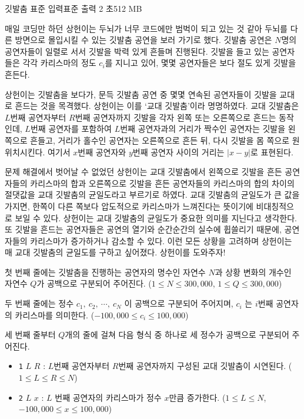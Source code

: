 \begin{problem}{깃발춤}
    {표준 입력}{표준 출력}
    {2 초}{512 MB}{}
    
    매일 코딩만 하던 상헌이는 두뇌가 너무 코드에만 범벅이 되고 있는 것 같아 두뇌를 다른 방면으로 몰입시킬 수 있는 깃발춤 공연을 보러 가기로 했다. 깃발춤 공연은 $ N $명의 공연자들이 일렬로 서서 깃발을 박력 있게 흔들며 진행된다. 깃발을 들고 있는 공연자들은 각각 카리스마의 정도 $ c_i $를 지니고 있어, 몇몇 공연자들은 보다 절도 있게 깃발을 흔든다.
    
    상헌이는 깃발춤을 보다가, 문득 깃발춤 공연 중 몇몇 연속된 공연자들이 깃발을 교대로 흔드는 것을 목격했다. 상헌이는 이를 `교대 깃발춤'이라 명명하였다. 교대 깃발춤은 $ L $번째 공연자부터 $ R $번째 공연자까지 깃발을 각자 왼쪽 또는 오른쪽으로 흔드는 동작인데, $ L $번째 공연자를 포함하여 $ L $번째 공연자과의 거리가 짝수인 공연자는 깃발을 왼쪽으로 흔들고, 거리가 홀수인 공연자는 오른쪽으로 흔든 뒤, 다시 깃발을 몸 쪽으로 원위치시킨다. 여기서 $ x $번째 공연자와 $ y $번째 공연자 사이의 거리는 $ |x - y| $로 표현된다.
    
    문제 해결에서 벗어날 수 없었던 상헌이는 교대 깃발춤에서 왼쪽으로 깃발을 흔든 공연자들의 카리스마의 합과 오른쪽으로 깃발을 흔든 공연자들의 카리스마의 합의 차이의 절댓값을 교대 깃발춤의 균일도라고 부르기로 하였다. 교대 깃발춤의 균일도가 큰 값을 가지면, 한쪽이 다른 쪽보다 압도적으로 카리스마가 느껴진다는 뜻이기에 비대칭적으로 보일 수 있다. 상헌이는 교대 깃발춤의 균일도가 중요한 의미를 지닌다고 생각한다. 또 깃발을 흔드는 공연자들은 공연의 열기와 순간순간의 실수에 휩쓸리기 때문에, 공연자들의 카리스마가 증가하거나 감소할 수 있다. 이런 모든 상황을 고려하며 상헌이는 매 교대 깃발춤의 균일도를 구하고 싶어졌다. 상헌이를 도와주자!
    
    \InputFile
    
    첫 번째 줄에는 깃발춤을 진행하는 공연자의 명수인 자연수 $ N $과 상황 변화의 개수인 자연수 $ Q $가 공백으로 구분되어 주어진다. ($ 1 \leq N \leq 300,000 $, $ 1 \leq Q \leq 300,000 $)
    
    두 번째 줄에는 정수 $ c_1,\ c_2,\ \cdots,\ c_N $ 이 공백으로 구분되어 주어지며, $ c_i $ 는 $ i $번째 공연자의 카리스마를 의미한다. ($ -100,000 \leq c_i \leq 100,000 $)
    
    세 번째 줄부터 $ Q $개의 줄에 걸쳐 다음 형식 중 하나로 세 정수가 공백으로 구분되어 주어진다.
    \begin{itemize}
        \item \verb|1| $ L $ $ R $ : $ L $번째 공연자부터 $ R $번째 공연자까지 구성된 교대 깃발춤이 시연된다. ($ 1 \leq L \leq R \leq N $)
        \item \verb|2| $ L $ $ x $ : $ L $ 번째 공연자의 카리스마가 정수 $ x $만큼 증가한다. ($ 1 \leq L \leq N $, $ -100,000 \leq x \leq 100,000 $)


\end{itemize}
\end{problem}
